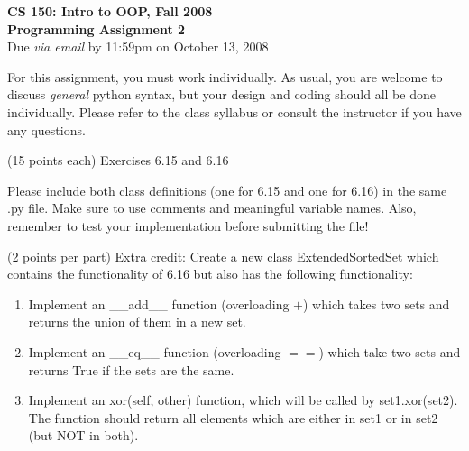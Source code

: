 \documentclass[11pt]{article}
\begin{document}

\begin{center}
\LARGE \textbf{CS 150: Intro to OOP, Fall 2008}
\\
\textbf{Programming Assignment 2}
\\[1ex]
\Large Due \emph{via email} by 11:59pm on October 13, 2008\\

\end{center}

For this assignment, you must work individually.  As usual, you are
welcome to discuss {\em general} python syntax, but your design and
coding should all be done individually.  Please refer to the class
syllabus or consult the instructor if you have any questions.

\begin{problems}
\item (15 points each) Exercises 6.15 and 6.16

Please include both class definitions (one for 6.15 and one for
6.16) in the same .py file.  Make sure to use comments and
meaningful variable names.  Also, remember to test your
implementation before submitting the file!

\item (2 points per part) Extra credit: Create a new class ExtendedSortedSet which
contains the functionality of 6.16 but also has the following
functionality:

\begin{enumerate}
\item Implement an \_\_add\_\_ function (overloading $+$) which takes two sets and returns
the union of them in a new set.

\item Implement an \_\_eq\_\_ function (overloading $==$) which take two sets and returns
True if the sets are the same.

\item Implement an xor(self, other) function, which will be called by
set1.xor(set2).  The function should return  all elements which are
either in set1 or in set2 (but NOT in both).
\end{enumerate}

\end{problems}
\end{document}
